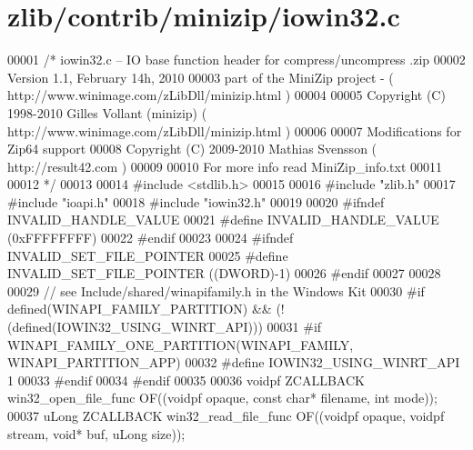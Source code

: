 \hypertarget{zlib_2contrib_2minizip_2iowin32_8c_source}{}\section{zlib/contrib/minizip/iowin32.c}
\label{zlib_2contrib_2minizip_2iowin32_8c_source}

\begin{DoxyCode}
00001 \textcolor{comment}{/* iowin32.c -- IO base function header for compress/uncompress .zip}
00002 \textcolor{comment}{     Version 1.1, February 14h, 2010}
00003 \textcolor{comment}{     part of the MiniZip project - ( http://www.winimage.com/zLibDll/minizip.html )}
00004 \textcolor{comment}{}
00005 \textcolor{comment}{         Copyright (C) 1998-2010 Gilles Vollant (minizip) ( http://www.winimage.com/zLibDll/minizip.html )}
00006 \textcolor{comment}{}
00007 \textcolor{comment}{         Modifications for Zip64 support}
00008 \textcolor{comment}{         Copyright (C) 2009-2010 Mathias Svensson ( http://result42.com )}
00009 \textcolor{comment}{}
00010 \textcolor{comment}{     For more info read MiniZip\_info.txt}
00011 \textcolor{comment}{}
00012 \textcolor{comment}{*/}
00013 
00014 \textcolor{preprocessor}{#include <stdlib.h>}
00015 
00016 \textcolor{preprocessor}{#include "zlib.h"}
00017 \textcolor{preprocessor}{#include "ioapi.h"}
00018 \textcolor{preprocessor}{#include "iowin32.h"}
00019 
00020 \textcolor{preprocessor}{#ifndef INVALID\_HANDLE\_VALUE}
00021 \textcolor{preprocessor}{#define INVALID\_HANDLE\_VALUE (0xFFFFFFFF)}
00022 \textcolor{preprocessor}{#endif}
00023 
00024 \textcolor{preprocessor}{#ifndef INVALID\_SET\_FILE\_POINTER}
00025 \textcolor{preprocessor}{#define INVALID\_SET\_FILE\_POINTER ((DWORD)-1)}
00026 \textcolor{preprocessor}{#endif}
00027 
00028 
00029 \textcolor{comment}{// see Include/shared/winapifamily.h in the Windows Kit}
00030 \textcolor{preprocessor}{#if defined(WINAPI\_FAMILY\_PARTITION) && (!(defined(IOWIN32\_USING\_WINRT\_API)))}
00031 \textcolor{preprocessor}{#if WINAPI\_FAMILY\_ONE\_PARTITION(WINAPI\_FAMILY, WINAPI\_PARTITION\_APP)}
00032 \textcolor{preprocessor}{#define IOWIN32\_USING\_WINRT\_API 1}
00033 \textcolor{preprocessor}{#endif}
00034 \textcolor{preprocessor}{#endif}
00035 
00036 voidpf  ZCALLBACK win32\_open\_file\_func  OF((voidpf opaque, \textcolor{keyword}{const} \textcolor{keywordtype}{char}* filename, \textcolor{keywordtype}{int} mode));
00037 uLong   ZCALLBACK win32\_read\_file\_func  OF((voidpf opaque, voidpf stream, \textcolor{keywordtype}{void}* buf, uLong size));

\end{DoxyCode}
